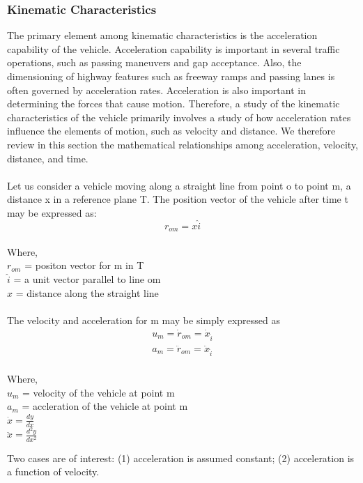 \subsubsection{Kinematic Characteristics}
The primary element among kinematic characteristics is the acceleration capability of the vehicle. Acceleration capability is important in several traffic operations, such as passing maneuvers and gap acceptance. Also, the dimensioning of highway features such as freeway ramps and passing lanes is often governed by acceleration rates. Acceleration is also important in determining the forces that cause motion. Therefore, a study of the kinematic characteristics of the vehicle primarily involves a study of how acceleration rates influence the elements of motion, such as velocity and distance. We therefore review in this section the mathematical relationships among acceleration, velocity, distance, and time.
\\\\
Let us consider a vehicle moving along a straight line from point o to point m, a distance x in a reference plane T. The position vector of the vehicle after time t may be expressed as:
\begin{equation}
	r_{om} = x \hat{i}
\end{equation}
\\
Where,\\
\hspace*{10mm}$ r_{om} $ = positon vector for m in T\\
\hspace*{10mm}$\hat{i}$ = a unit vector parallel to line om\\
\hspace*{10mm}$x$ = distance along the straight line\\\\
The velocity and acceleration for m may be simply expressed as
\begin{gather}
	u_m = \dot{r}_{om} = \dot{x}_{\hat{i}}\\
	a_m = \ddot{r}_{om} = \ddot{x}_{\hat{i}}
\end{gather}
\\
Where,\\
\hspace*{10mm}$u_m$ = velocity of the vehicle at point m\\
\hspace*{10mm}$a_m$ = accleration of the vehicle at point m\\
\hspace*{10mm}$\dot{x} = \frac{dy}{dx}$\\
\hspace*{10mm}$\ddot{x} = \frac{d^2y}{dx^2}$\\
\par
Two cases are of interest: (1) acceleration is assumed constant; (2) acceleration is a function of velocity.
